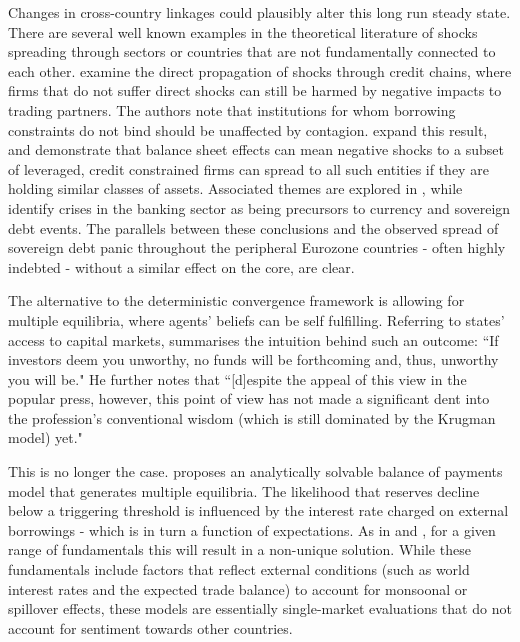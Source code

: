 \documentclass[../base.tex]{subfiles}
\begin{document}
Changes in cross-country linkages could plausibly alter this long run steady state. There are several well known examples in the theoretical literature of shocks spreading through sectors or countries that are not fundamentally connected to each other. \cite{kiyotaki1997credit} examine the direct propagation of shocks through credit chains, where firms that do not suffer direct shocks can still be harmed by negative impacts to trading partners. The authors note that institutions for whom borrowing constraints do not bind should be unaffected by contagion. \cite{kiyotaki2002balance} expand this result, and demonstrate that balance sheet effects can mean negative shocks to a subset of leveraged, credit constrained firms can spread to all such entities if they are holding similar classes of assets. Associated themes are explored in \cite{rochet1996interbank}, while \cite{kaminsky1999twin} identify crises in the banking sector as being precursors to currency and sovereign debt events. The parallels between these conclusions and the observed spread of sovereign debt panic throughout the peripheral Eurozone countries - often highly indebted - without a similar effect on the core, are clear.


The alternative to the deterministic convergence framework is allowing for multiple equilibria, where agents' beliefs can be self fulfilling. Referring to states' access to capital markets, \cite{calvo1995varieties} summarises the intuition behind such an outcome: ``If investors deem you unworthy, no funds will be forthcoming and, thus, unworthy you will be." He further notes that ``[d]espite the appeal of this view in the popular press, however, this point of view has not made a significant dent into the profession's conventional wisdom (which is still dominated by the Krugman model) yet."

This is no longer the case. \cite{masson1999contagion} proposes an analytically solvable balance of payments model that generates multiple equilibria. The likelihood that reserves decline below a triggering threshold is influenced by the interest rate charged on external borrowings - which is in turn a function of expectations. As in \cite{obstfeld1996models} and \cite{jeanne1997currency}, for a given range of fundamentals this will result in a non-unique solution. While these fundamentals include factors that reflect external conditions (such as world interest rates and the expected trade balance) to account for monsoonal or spillover effects, these models are essentially single-market evaluations that do not account for sentiment towards other countries. 
\end{document}

